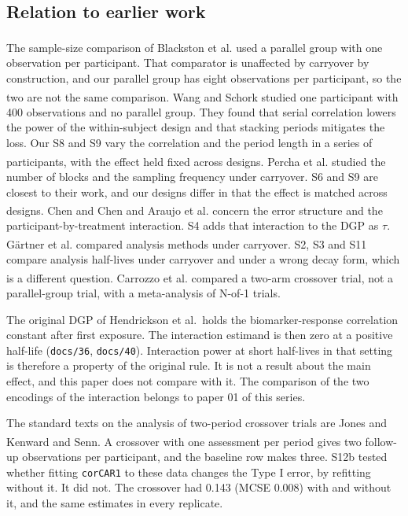 \documentclass[
  11pt,
]{article}
\begin{document}
\subsection{Relation to earlier work}\label{relation-to-earlier-work}

The sample-size comparison of Blackston et al.\textsuperscript{} used a parallel group with one observation per participant. That comparator is unaffected by carryover by construction, and our parallel group has eight observations per participant, so the two are not the same comparison. Wang and Schork\textsuperscript{} studied one participant with 400 observations and no parallel group. They found that serial correlation lowers the power of the within-subject design and that stacking periods mitigates the loss. Our S8 and S9 vary the correlation and the period length in a series of participants, with the effect held fixed across designs. Percha et al.\textsuperscript{} studied the number of blocks and the sampling frequency under carryover. S6 and S9 are closest to their work, and our designs differ in that the effect is matched across designs. Chen and Chen\textsuperscript{} and Araujo et al.\textsuperscript{} concern the error structure and the participant-by-treatment interaction. S4 adds that interaction to the DGP as \(\tau\). Gärtner et al.\textsuperscript{} compared analysis methods under carryover. S2, S3 and S11 compare analysis half-lives under carryover and under a wrong decay form, which is a different question. Carrozzo et al.\textsuperscript{} compared a two-arm crossover trial, not a parallel-group trial, with a meta-analysis of N-of-1 trials.

The original DGP of Hendrickson et al.~holds the biomarker-response correlation constant after first exposure. The interaction estimand is then zero at a positive half-life (\texttt{docs/36}, \texttt{docs/40}). Interaction power at short half-lives in that setting is therefore a property of the original rule. It is not a result about the main effect, and this paper does not compare with it. The comparison of the two encodings of the interaction belongs to paper 01 of this series.

The standard texts on the analysis of two-period crossover trials are Jones and Kenward\textsuperscript{} and Senn\textsuperscript{}. A crossover with one assessment per period gives two follow-up observations per participant, and the baseline row makes three. S12b tested whether fitting \texttt{corCAR1} to these data changes the Type I error, by refitting without it. It did not. The crossover had 0.143 (MCSE 0.008) with and without it, and the same estimates in every replicate.
\end{document}
